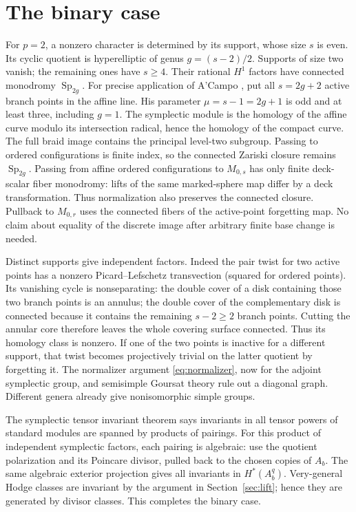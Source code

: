 \documentclass[11pt]{article}
\theoremstyle{definition}
\newcommand{\Sp}{\operatorname{Sp}}
\begin{document}
\section{The binary case}\label{sec:binary}
For $p=2$, a nonzero character is determined by its support, whose size
$s$ is even. Its cyclic quotient is hyperelliptic of genus
$g=(s-2)/2$. Supports of size two vanish; the remaining ones have $s\geq4$.
Their rational $H^1$ factors have connected monodromy $\Sp_{2g}$.
For precise application of A'Campo \cite[Theorem~1, p.~319]{ACampo},
put all $s=2g+2$ active branch points in the affine line. His parameter
$\mu=s-1=2g+1$ is odd and at least three, including $g=1$.
The symplectic module is the homology of the affine curve modulo its
intersection radical, hence the homology of the compact curve.
The full braid image contains the principal level-two subgroup. Passing
to ordered configurations is finite index, so the connected Zariski closure
remains $\Sp_{2g}$. Passing from affine ordered configurations to $M_{0,s}$
has only finite deck-scalar fiber monodromy: lifts of the same marked-sphere
map differ by a deck transformation. Thus normalization also preserves the
connected closure. Pullback to $M_{0,r}$ uses the connected fibers of the
active-point forgetting map. No claim about equality of the discrete image after
arbitrary finite base change is needed.

Distinct supports give independent factors. Indeed the pair twist for two
active points has a nonzero Picard--Lefschetz transvection (squared for
ordered points). Its vanishing cycle is nonseparating: the double cover of
a disk containing those two branch points is an annulus; the double cover
of the complementary disk is connected because it contains the remaining
$s-2\geq2$ branch points. Cutting the annular core therefore leaves the
whole covering surface connected. Thus its homology class is nonzero.
If one of the two points is inactive for a different support, that twist
becomes projectively trivial on the latter quotient by forgetting it.
The normalizer argument \eqref{eq:normalizer}, now for the adjoint
symplectic group, and semisimple Goursat theory rule out a diagonal graph.
Different genera already give nonisomorphic simple groups.

The symplectic tensor invariant theorem
\cite[Section~7.3, Theorem~7.4 and Corollary~7.5]{Goodman} says invariants
in all tensor powers of standard modules are spanned by products of pairings.
For this
product of independent symplectic factors, each pairing is algebraic: use
the quotient polarization and its Poincare divisor, pulled back to the
chosen copies of $A_b$. The same algebraic exterior projection gives all
invariants in $H^*(A_b^q)$. Very-general Hodge classes are invariant by the
argument in Section~\ref{sec:lift}; hence they are generated by divisor
classes. This completes the binary case.
\end{document}
